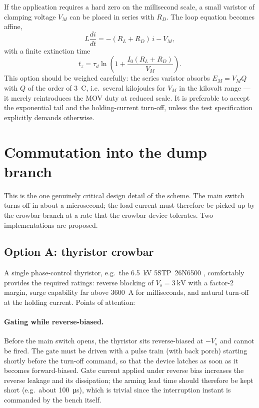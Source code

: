 \documentclass[11pt,a4paper]{article}
\begin{document}
If the application requires a hard zero on the millisecond scale, a small
varistor of clamping voltage $V_M$ can be placed in series with $R_D$. The
loop equation becomes affine,
\begin{equation}
L\frac{di}{dt} = -(R_L+R_D)\,i - V_M ,
\end{equation}
with a finite extinction time
\begin{equation}
t_z = \tau_d \ln\!\left(1 + \frac{I_0 (R_L+R_D)}{V_M}\right).
\end{equation}
This option should be weighed carefully: the series varistor absorbs
$E_M = V_M Q$ with $Q$ of the order of \SI{3}{\coulomb}, i.e.\ several
kilojoules for $V_M$ in the kilovolt range --- it merely reintroduces the MOV
duty at reduced scale. It is preferable to accept the exponential tail and
the holding-current turn-off, unless the test specification explicitly
demands otherwise.

\section{Commutation into the dump branch}
\label{sec:commutation}

This is the one genuinely critical design detail of the scheme. The main
switch turns off in about a microsecond; the load current must therefore be
picked up by the crowbar branch at a rate that the crowbar device tolerates.
Two implementations are proposed.

\subsection{Option A: thyristor crowbar}
\label{sec:optA}

A single phase-control thyristor, e.g.\ the \SI{6.5}{\kilo\volt}
5STP~26N6500 \cite{pct}, comfortably provides the required ratings: reverse
blocking of $V_s = \SI{3}{\kilo\volt}$ with a factor-2 margin, surge capability
far above \SI{3600}{\ampere} for milliseconds, and natural turn-off at the
holding current. Points of attention:

\paragraph{Gating while reverse-biased.} Before the main switch opens, the
thyristor sits reverse-biased at $-V_s$ and cannot be fired. The gate must
be driven with a pulse train (with back porch) starting shortly before the
turn-off command, so that the device latches as soon as it becomes
forward-biased. Gate current applied under reverse bias increases the reverse
leakage and its dissipation; the arming lead time should therefore be kept
short (e.g.\ about \SI{100}{\micro\second}), which is trivial since the
interruption instant is commanded by the bench itself.
\end{document}
